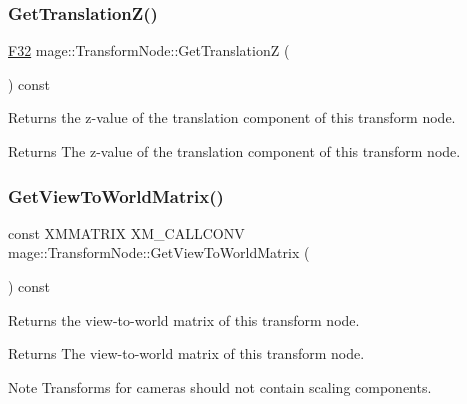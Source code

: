 \subsubsection{\texorpdfstring{Get\+Translation\+Z()}{GetTranslationZ()}}
{\footnotesize\ttfamily \hyperlink{namespacemage_aa97e833b45f06d60a0a9c4fc22ae02c0}{F32} mage\+::\+Transform\+Node\+::\+Get\+TranslationZ (\begin{DoxyParamCaption}{ }\end{DoxyParamCaption}) const\hspace{0.3cm}{\ttfamily [noexcept]}}

Returns the z-\/value of the translation component of this transform node.

\begin{DoxyReturn}{Returns}
The z-\/value of the translation component of this transform node. 
\end{DoxyReturn}
\hypertarget{classmage_1_1_transform_node_a98c7c4b977174b6b28cadb9db327aaef}{}\label{classmage_1_1_transform_node_a98c7c4b977174b6b28cadb9db327aaef} 
\subsubsection{\texorpdfstring{Get\+View\+To\+World\+Matrix()}{GetViewToWorldMatrix()}}
{\footnotesize\ttfamily const X\+M\+M\+A\+T\+R\+IX X\+M\+\_\+\+C\+A\+L\+L\+C\+O\+NV mage\+::\+Transform\+Node\+::\+Get\+View\+To\+World\+Matrix (\begin{DoxyParamCaption}{ }\end{DoxyParamCaption}) const\hspace{0.3cm}{\ttfamily [noexcept]}}

Returns the view-\/to-\/world matrix of this transform node.

\begin{DoxyReturn}{Returns}
The view-\/to-\/world matrix of this transform node. 
\end{DoxyReturn}
\begin{DoxyNote}{Note}
Transforms for cameras should not contain scaling components. 
\end{DoxyNote}
\hypertarget{classmage_1_1_transform_node_aca4f35bb8aaffabc8c825133a7a307e9}{}\label{classmage_1_1_transform_node_aca4f35bb8aaffabc8c825133a7a307e9} 
